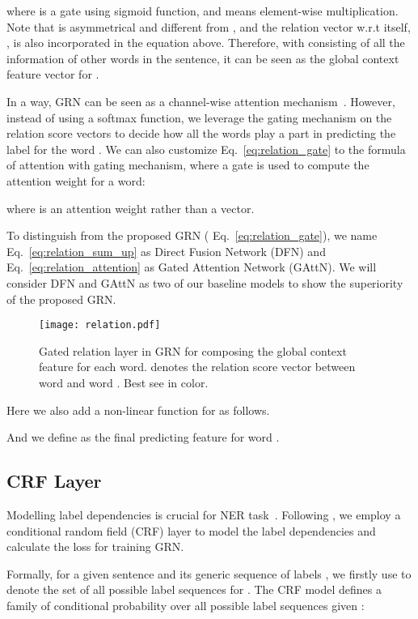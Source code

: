 \documentclass[letterpaper]{article} \usepackage{aaai19}  \usepackage{times}  \usepackage{helvet}  \usepackage{courier}  \usepackage{url}  \usepackage{graphicx}  \usepackage{amsmath}
\newcommand{\ie}{\text{i.e.,}}
\newcommand{\GAN}{GAttN}
\newcommand{\GRN}{GRN}
\begin{document}
where  is a gate using sigmoid function, and  means element-wise multiplication. Note that  is asymmetrical and different from , and the relation vector w.r.t  itself, \ie{} , is also incorporated in the equation above. Therefore, with  consisting of all the information of other words in the sentence, it can be seen as the global context feature vector for .

In a way, \GRN{} can be seen as a channel-wise attention mechanism~\cite{chen2017sca}. However, instead of using a softmax function, we leverage the gating mechanism on the relation score vectors to decide how all the words play a part in predicting the label for the word . We can also customize Eq.~\ref{eq:relation_gate} to the formula of attention with gating mechanism, where a gate is used to compute the attention weight for a word:

where  is an attention weight rather than a vector. 

To distinguish from the proposed \GRN{} (\ie{} Eq.~\ref{eq:relation_gate}), we name Eq.~\ref{eq:relation_sum_up} as Direct Fusion Network (DFN) and Eq.~\ref{eq:relation_attention} as Gated Attention Network (\GAN{}). We will consider DFN and \GAN{} as two of our baseline models to show the superiority of the proposed \GRN{}.

\begin{figure}[!t] \centering
  \texttt{[image: relation.pdf]}
  \caption{Gated relation layer in \GRN{} for composing the global context feature for each word.  denotes the relation score vector between word  and word . Best see in color.}
  \label{fig:relation}
\end{figure}

Here we also add a non-linear function for  as follows.

And we define  as the final predicting feature for word .

\subsection{CRF Layer}
Modelling label dependencies is crucial for NER task~\cite{ma2016CNNBLSTMCRF,Liu2018Empower}. Following \cite{ma2016CNNBLSTMCRF,huang2015bidirectional}, we employ a conditional random field (CRF) layer to model the label dependencies and calculate the loss for training \GRN{}.

Formally, for a given sentence  and its generic sequence of labels , we firstly use  to denote the set of all possible label sequences for . The CRF model defines a family of conditional probability  over all possible label sequences  given :
\end{document}
